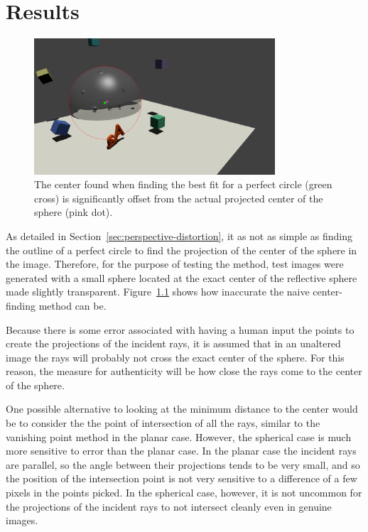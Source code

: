\documentclass{thesis}
\begin{document}



\chapter{Results}
\begin{figure}[h]
	\centering
    	\includegraphics[width=0.8\textwidth]{center-error}
	\caption{The center found when finding the best fit for a perfect circle (green cross) is significantly offset from the actual projected center of the sphere (pink dot).}
	\label{center-error}
\end{figure}

As detailed in Section~\ref{sec:perspective-distortion}, it as not as simple as finding the outline of a perfect circle to find the projection of the center of the sphere in the image. Therefore, for the purpose of testing the method, test images were generated with a small sphere located at the exact center of the reflective sphere made slightly transparent. Figure~\ref{center-error} shows how inaccurate the naive center-finding method can be.

Because there is some error associated with having a human input the points to create the projections of the incident rays, it is assumed that in an unaltered image the rays will probably not cross the exact center of the sphere. For this reason, the measure for authenticity will be how close the rays come to the center of the sphere.

One possible alternative to looking at the minimum distance to the center would be to consider the the point of intersection of all the rays, similar to the vanishing point method in the planar case. However, the spherical case is much more sensitive to error than the planar case. In the planar case the incident rays are parallel, so the angle between their projections tends to be very small, and so the position of the intersection point is not very sensitive to a difference of a few pixels in the points picked. In the spherical case, however, it is not uncommon for the projections of the incident rays to not intersect cleanly even in genuine images.
\end{document}
